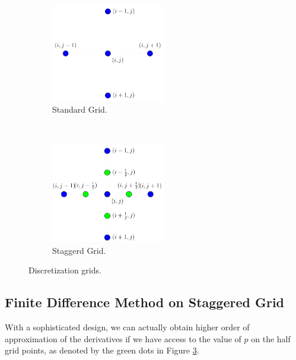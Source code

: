 \documentclass[11pt]{article}
\theoremstyle{plain}
\theoremstyle{definition}
\theoremstyle{remark}
\numberwithin{equation}{section}
\begin{document}
\begin{figure}
\centering
\begin{subfigure}[b]{.4\textwidth}
\includegraphics[width=5cm]{Fig/stanGrid}
\caption{Standard Grid.}
\label{fig:stanG}
\end{subfigure}
~~~~~
\begin{subfigure}[b]{0.4\textwidth}
\includegraphics[width=5cm]{Fig/StagGrid}
\caption{Staggerd Grid.}
\label{fig:stagG}
\end{subfigure}
\caption{Discretization grids.}
\end{figure}

\subsection{Finite Difference Method on Staggered Grid}
With a sophisticated design, we can actually obtain higher order of approximation of the derivatives if we have access to the value of $p$ on the half grid points, as denoted by the green dots in Figure \ref{fig:stagG}. 
\end{document}
